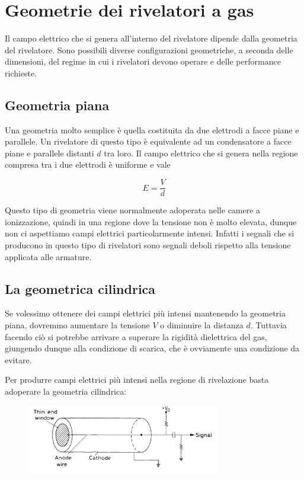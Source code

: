 \section{Geometrie dei rivelatori a gas}

Il campo elettrico che si genera all'interno del rivelatore dipende dalla geometria del rivelatore. Sono possibili diverse configurazioni geometriche, a seconda delle dimensioni, del regime in cui i rivelatori devono operare e delle performance richieste.

\subsection{Geometria piana}
Una geometria molto semplice è quella costituita da due elettrodi a facce piane e parallele. Un rivelatore di questo tipo è equivalente ad un condensatore a facce piane e parallele distanti $d$ tra loro. Il campo elettrico che si genera nella regione compresa tra i due elettrodi è uniforme e vale

\begin{equation*}
   E=\frac{V}{d}
\end{equation*}

Questo tipo di geometria viene normalmente adoperata nelle camere a ionizzazione, quindi in una regione dove la tensione non è molto elevata, dunque non ci aspettiamo campi elettrici particolarmente intensi. Infatti i segnali che si producono in questo tipo di rivelatori sono segnali deboli rispetto alla tensione applicata alle armature.

\subsection{La geometrica cilindrica}
Se volessimo ottenere dei campi elettrici più intensi mantenendo la geometria piana, dovremmo aumentare la tensione $V$ o diminuire la distanza $d$. Tuttavia facendo ciò si potrebbe arrivare a superare la rigidità dielettrica del gas, giungendo dunque alla condizione di scarica, che è ovviamente una condizione da evitare.

Per produrre campi elettrici più intensi nella regione di rivelazione basta adoperare la geometria cilindrica:

\begin{figure}[H]
   \centering
   \includegraphics[width=0.75\textwidth]{immagini/geometria_cilindrica.png}
\end{figure}

